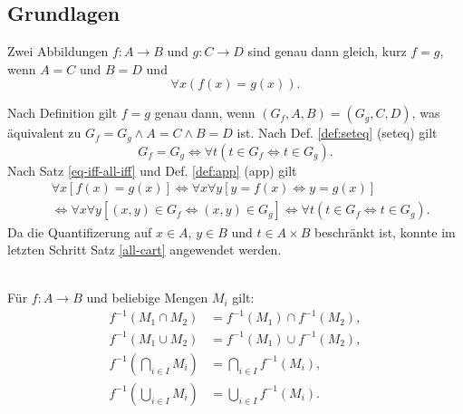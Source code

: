 \subsection{Grundlagen}
\begin{Satz}%
\label{feq}
Zwei Abbildungen $f\colon A\to B$ und $g\colon C\to D$ sind genau
dann gleich, kurz $f=g$, wenn $A=C$ und $B=D$ und
\[\forall x(f(x)=g(x)).\]
\end{Satz}

\begin{Beweis}
Nach Definition gilt $f=g$ genau dann, wenn $(G_f,A,B)=(G_g,C,D)$,
was äquivalent zu $G_f=G_g\land A=C\land B=D$ ist. Nach Def.
\ref{def:seteq} (seteq) gilt
\[G_f=G_g\iff \forall t(t\in G_f\iff t\in G_g).\]
Nach Satz \ref{eq-iff-all-iff} und Def. \ref{def:app} (app) gilt
\begin{align*}
&\forall x[f(x)=g(x)] \iff \forall x\forall y[y=f(x)\iff y=g(x)]\\
&\iff \forall x\forall y[(x,y)\in G_f\iff (x,y)\in G_g]
\iff \forall t(t\in G_f\iff t\in G_g).
\end{align*}
Da die Quantifizerung auf $x\in A$, $y\in B$ und $t\in A\times B$
beschränkt ist, konnte im letzten Schritt Satz \ref{all-cart}
angewendet werden.\;\qedsymbol
\end{Beweis}

\begin{Satz}%
\mbox{}\\
Für $f\colon A\to B$ und beliebige Mengen $M_i$ gilt:
\begin{align}
f^{-1}(M_1\cap M_2) &= f^{-1}(M_1)\cap f^{-1}(M_2),\\
f^{-1}(M_1\cup M_2) &= f^{-1}(M_1)\cup f^{-1}(M_2),\\
f^{-1}(\bigcap_{i\in I} M_i) &= \bigcap_{i\in I} f^{-1}(M_i),\\
f^{-1}(\bigcup_{i\in I} M_i) &= \bigcup_{i\in I} f^{-1}(M_i).
\end{align}
\end{Satz}

